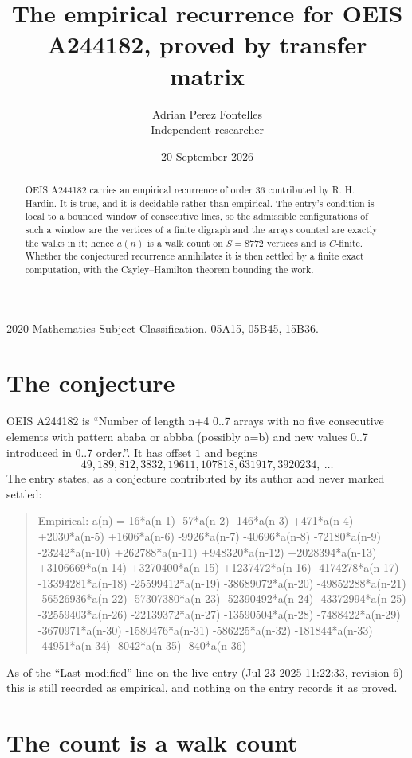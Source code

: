 \documentclass[11pt,a4paper]{article}
\title{The empirical recurrence for OEIS A244182, proved by transfer matrix}
\author{Adrian Perez Fontelles\\ \small Independent researcher}
\date{20 September 2026}
\theoremstyle{plain}
\theoremstyle{definition}
\begin{document}
\maketitle

\begin{abstract}
OEIS A244182 carries an empirical recurrence of order $36$ contributed by R. H. Hardin. It is
true, and it is decidable rather than empirical. The entry's condition is local to a bounded window of consecutive lines, so
the admissible configurations of such a window are the vertices of a finite digraph and the
arrays counted are exactly the walks in it; hence $a(n)$ is a walk count on $S=8772$ vertices
and is $C$-finite. Whether the conjectured recurrence annihilates it is then settled by a
finite exact computation, with the Cayley--Hamilton theorem bounding the work.
\end{abstract}

\noindent\small 2020 Mathematics Subject Classification. 05A15, 05B45, 15B36.\normalsize

\section{The conjecture}

OEIS A244182 is ``Number of length n+4 0..7 arrays with no five consecutive elements with pattern ababa or abbba (possibly a=b) and new values 0..7 introduced in 0..7 order.''. It has offset $1$ and begins
\[
49, 189, 812, 3832, 19611, 107818, 631917, 3920234,\ \dots
\]
The entry states, as a conjecture contributed by its author and never marked settled:
\begin{quote}\raggedright\small
Empirical: a(n) = 16*a(n-1) -57*a(n-2) -146*a(n-3) +471*a(n-4) +2030*a(n-5) +1606*a(n-6) -9926*a(n-7) -40696*a(n-8) -72180*a(n-9) -23242*a(n-10) +262788*a(n-11) +948320*a(n-12) +2028394*a(n-13) +3106669*a(n-14) +3270400*a(n-15) +1237472*a(n-16) -4174278*a(n-17) -13394281*a(n-18) -25599412*a(n-19) -38689072*a(n-20) -49852288*a(n-21) -56526936*a(n-22) -57307380*a(n-23) -52390492*a(n-24) -43372994*a(n-25) -32559403*a(n-26) -22139372*a(n-27) -13590504*a(n-28) -7488422*a(n-29) -3670971*a(n-30) -1580476*a(n-31) -586225*a(n-32) -181844*a(n-33) -44951*a(n-34) -8042*a(n-35) -840*a(n-36)
\end{quote}
As of the ``Last modified'' line on the live entry (Jul 23 2025 11:22:33, revision 6) this is still
recorded as empirical, and nothing on the entry records it as proved.

\section{The count is a walk count}
\end{document}
